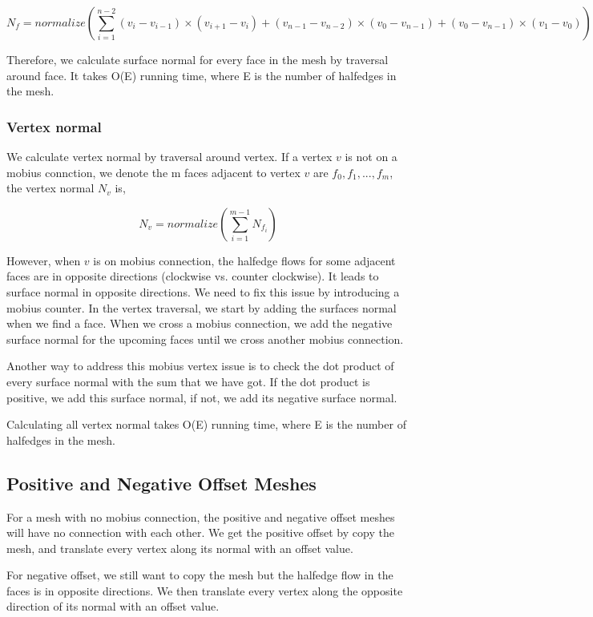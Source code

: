 \documentclass[12pt]{article}
\begin{document}
$$N_{f} = normalize(\sum\limits_{i=1}^{n-2} (v_i - v_{i - 1}) \times (v_{i + 1} - v_{i}) + (v_{n - 1} - v_{n - 2}) \times (v_0 - v_{n - 1}) + (v_0 - v_{n - 1}) \times (v_1 - v_0))$$

Therefore, we calculate surface normal for every face in the mesh by traversal around face. It takes O(E) running time, where E is the number of halfedges in the mesh.

\subsubsection{Vertex normal}
We calculate vertex normal by traversal around vertex. If a vertex $v$ is not on a mobius connction, we denote the m faces adjacent to vertex $v$ are $f_0, f_1, ..., f_m$, the vertex normal $N_v$ is,

$$N_{v} = normalize(\sum\limits_{i=1}^{m-1} N_{f_i})$$

However, when $v$ is on mobius connection, the halfedge flows for some adjacent faces are in opposite directions (clockwise vs. counter clockwise). It leads to surface normal in opposite directions. We need to fix this issue by introducing a mobius counter. In the vertex traversal, we start by adding the surfaces normal when we find a face. When we cross a mobius connection, we add the negative surface normal for the upcoming faces until we cross another mobius connection.

Another way to address this mobius vertex issue is to check the dot product of every surface normal with the sum that we have got. If the dot product is positive, we add this surface normal, if not, we add its negative surface normal.

Calculating all vertex normal takes O(E) running time, where E is the number of halfedges in the mesh.

\subsection{Positive and Negative Offset Meshes}

For a mesh with no mobius connection, the positive and negative offset meshes will have no connection with each other. We get the positive offset by copy the mesh, and translate every vertex along its normal with an offset value. 

For negative offset, we still want to copy the mesh but the halfedge flow in the faces is in opposite directions. We then translate every vertex along the opposite direction of its normal with an offset value.
\end{document}
